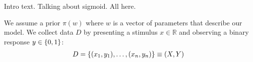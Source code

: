 
Intro text. Talking about sigmoid. All here.

We assume a prior $\pi(w)$ where $w$ is a vector of parameters that describe our model.
We collect data $D$ by presenting a stimulus $x \in \mathbb{R}$ and observing a binary response $y \in \left\{ 0, 1 \right\}$:
\begin{align}
	 D = \left\{ (x_1, y_1), \dots, (x_n, y_n) \right\} \equiv (X, Y)
\end{align}

